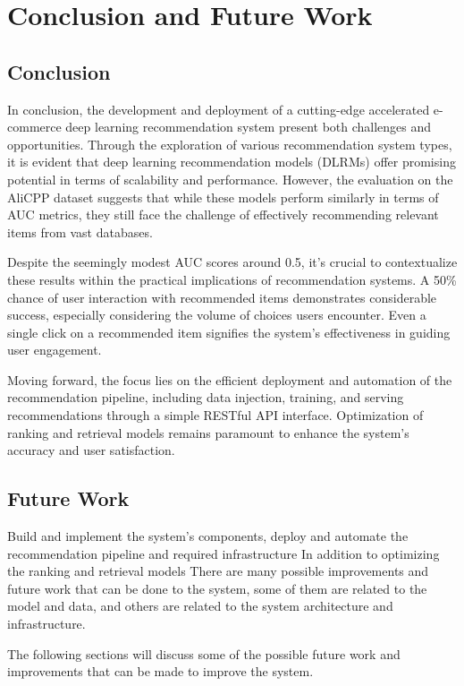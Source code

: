 \chapter{Conclusion and Future Work}
\minitoc

\section{Conclusion}
In conclusion, the development and deployment of a cutting-edge accelerated e-commerce deep learning recommendation system present both challenges and opportunities. Through the exploration of various recommendation system types, it is evident that deep learning recommendation models (DLRMs) offer promising potential in terms of scalability and performance. However, the evaluation on the AliCPP dataset suggests that while these models perform similarly in terms of AUC metrics, they still face the challenge of effectively recommending relevant items from vast databases.

Despite the seemingly modest AUC scores around 0.5, it's crucial to contextualize these results within the practical implications of recommendation systems. A 50\% chance of user interaction with recommended items demonstrates considerable success, especially considering the volume of choices users encounter. Even a single click on a recommended item signifies the system's effectiveness in guiding user engagement.

Moving forward, the focus lies on the efficient deployment and automation of the recommendation pipeline, including data injection, training, and serving recommendations through a simple RESTful API interface. Optimization of ranking and retrieval models remains paramount to enhance the system's accuracy and user satisfaction.

\section{Future Work}
Build and implement the system's components, deploy and automate the recommendation pipeline and required infrastructure 
In addition to optimizing the ranking and retrieval models
There are many possible improvements and future work that can be done to the system, 
some of them are related to the model and data, and others are related to the system architecture and infrastructure.

The following sections will discuss some of the possible future work and improvements that can be made to improve the system.

